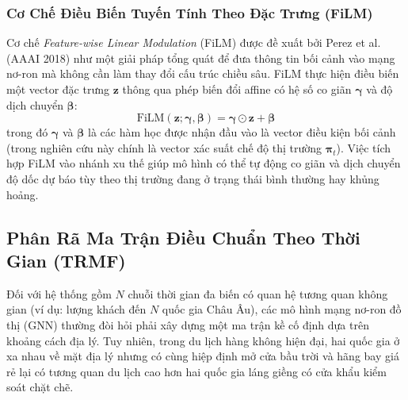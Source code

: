 \subsubsection{Cơ Chế Điều Biến Tuyến Tính Theo Đặc Trưng (FiLM)}
Cơ chế \textit{Feature-wise Linear Modulation} (FiLM) được đề xuất bởi Perez et al. (AAAI 2018) \cite{perez2018film} như một giải pháp tổng quát để đưa thông tin bối cảnh vào mạng nơ-ron mà không cần làm thay đổi cấu trúc chiều sâu. FiLM thực hiện điều biến một vector đặc trưng $\mathbf{z}$ thông qua phép biến đổi affine có hệ số co giãn $\bm{\gamma}$ và độ dịch chuyển $\bm{\beta}$:
\begin{equation}
    \text{FiLM}(\mathbf{z}; \bm{\gamma}, \bm{\beta}) = \bm{\gamma} \odot \mathbf{z} + \bm{\beta}
\end{equation}
trong đó $\bm{\gamma}$ và $\bm{\beta}$ là các hàm học được nhận đầu vào là vector điều kiện bối cảnh (trong nghiên cứu này chính là vector xác suất chế độ thị trường $\bm{\pi}_t$). Việc tích hợp FiLM vào nhánh xu thế giúp mô hình có thể tự động co giãn và dịch chuyển độ dốc dự báo tùy theo thị trường đang ở trạng thái bình thường hay khủng hoảng.

\subsection{Phân Rã Ma Trận Điều Chuẩn Theo Thời Gian (TRMF)}
Đối với hệ thống gồm $N$ chuỗi thời gian đa biến có quan hệ tương quan không gian (ví dụ: lượng khách đến $N$ quốc gia Châu Âu), các mô hình mạng nơ-ron đồ thị (GNN) thường đòi hỏi phải xây dựng một ma trận kề cố định dựa trên khoảng cách địa lý. Tuy nhiên, trong du lịch hàng không hiện đại, hai quốc gia ở xa nhau về mặt địa lý nhưng có cùng hiệp định mở cửa bầu trời và hãng bay giá rẻ lại có tương quan du lịch cao hơn hai quốc gia láng giềng có cửa khẩu kiểm soát chặt chẽ.

